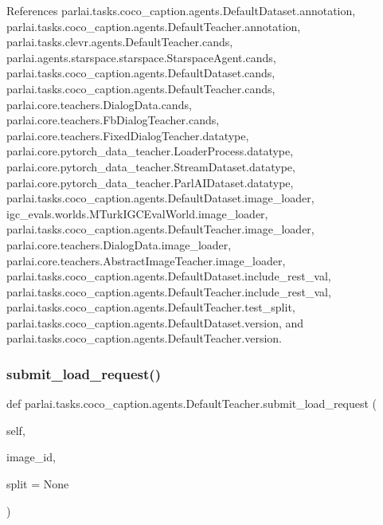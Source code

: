 References parlai.\+tasks.\+coco\+\_\+caption.\+agents.\+Default\+Dataset.\+annotation, parlai.\+tasks.\+coco\+\_\+caption.\+agents.\+Default\+Teacher.\+annotation, parlai.\+tasks.\+clevr.\+agents.\+Default\+Teacher.\+cands, parlai.\+agents.\+starspace.\+starspace.\+Starspace\+Agent.\+cands, parlai.\+tasks.\+coco\+\_\+caption.\+agents.\+Default\+Dataset.\+cands, parlai.\+tasks.\+coco\+\_\+caption.\+agents.\+Default\+Teacher.\+cands, parlai.\+core.\+teachers.\+Dialog\+Data.\+cands, parlai.\+core.\+teachers.\+Fb\+Dialog\+Teacher.\+cands, parlai.\+core.\+teachers.\+Fixed\+Dialog\+Teacher.\+datatype, parlai.\+core.\+pytorch\+\_\+data\+\_\+teacher.\+Loader\+Process.\+datatype, parlai.\+core.\+pytorch\+\_\+data\+\_\+teacher.\+Stream\+Dataset.\+datatype, parlai.\+core.\+pytorch\+\_\+data\+\_\+teacher.\+Parl\+A\+I\+Dataset.\+datatype, parlai.\+tasks.\+coco\+\_\+caption.\+agents.\+Default\+Dataset.\+image\+\_\+loader, igc\+\_\+evals.\+worlds.\+M\+Turk\+I\+G\+C\+Eval\+World.\+image\+\_\+loader, parlai.\+tasks.\+coco\+\_\+caption.\+agents.\+Default\+Teacher.\+image\+\_\+loader, parlai.\+core.\+teachers.\+Dialog\+Data.\+image\+\_\+loader, parlai.\+core.\+teachers.\+Abstract\+Image\+Teacher.\+image\+\_\+loader, parlai.\+tasks.\+coco\+\_\+caption.\+agents.\+Default\+Dataset.\+include\+\_\+rest\+\_\+val, parlai.\+tasks.\+coco\+\_\+caption.\+agents.\+Default\+Teacher.\+include\+\_\+rest\+\_\+val, parlai.\+tasks.\+coco\+\_\+caption.\+agents.\+Default\+Teacher.\+test\+\_\+split, parlai.\+tasks.\+coco\+\_\+caption.\+agents.\+Default\+Dataset.\+version, and parlai.\+tasks.\+coco\+\_\+caption.\+agents.\+Default\+Teacher.\+version.

\mbox{\label{classparlai_1_1tasks_1_1coco__caption_1_1agents_1_1DefaultTeacher_ac6b0eb2ddf6dcf03a750221b886ffd9b}} 
\subsubsection{\texorpdfstring{submit\+\_\+load\+\_\+request()}{submit\_load\_request()}}
{\footnotesize\ttfamily def parlai.\+tasks.\+coco\+\_\+caption.\+agents.\+Default\+Teacher.\+submit\+\_\+load\+\_\+request (\begin{DoxyParamCaption}\item[{}]{self,  }\item[{}]{image\+\_\+id,  }\item[{}]{split = {\ttfamily None} }\end{DoxyParamCaption})}



